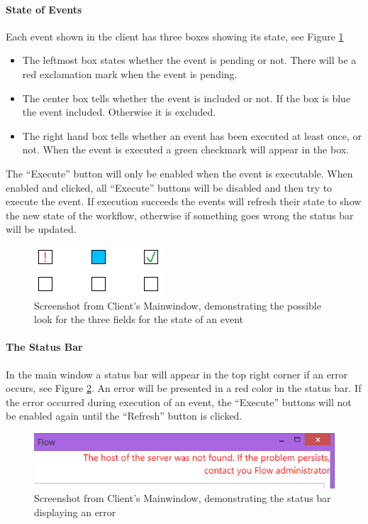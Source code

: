 \paragraph{State of Events}
Each event shown in the client has three boxes showing its state, see Figure \ref{fig:StateFieldsMainClient}
\begin{itemize}
\item The leftmost box states whether the event is pending or not. There will be a red exclamation mark when the event is pending.
\item The center box tells whether the event is included or not. If the box is blue the event included. Otherwise it is excluded.
\item The right hand box tells whether an event has been executed at least once, or not. When the event is executed a green checkmark will appear in the box.
\end{itemize}
The “Execute” button will only be enabled when the event is executable. When enabled and clicked, all “Execute” buttons will be disabled and then try to execute the event. If execution succeeds the events will refresh their state to show the new state of the workflow, otherwise if something goes wrong the status bar will be updated.

\begin{figure}[h!]
\centering
\includegraphics[width=0.3\linewidth]{Figures/EventState}
\caption{\label{fig:StateFieldsMainClient}Screenshot from Client's Mainwindow, demonstrating the possible look for the three fields for the state of an event}
\end{figure}

\paragraph{The Status Bar}
In the main window a status bar will appear in the top right corner if an error occurs, see Figure \ref{fig:StatusBar}. An error will be presented in a red color in the status bar. If the error occurred during execution of an event, the “Execute” buttons will not be enabled again until the “Refresh” button is clicked.

\begin{figure}[h!]
\centering
\includegraphics[width=0.8\linewidth]{Figures/StatusBar}
\caption{\label{fig:StatusBar}Screenshot from Client's Mainwindow, demonstrating the status bar displaying an error}
\end{figure}

